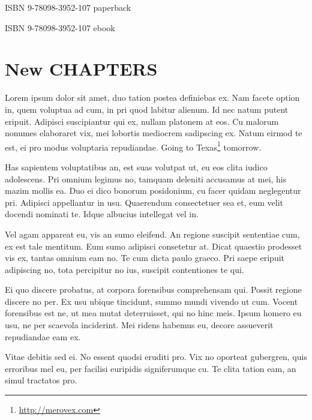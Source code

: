 \documentclass[10pt,]{book}
\DeclareRobustCommand{\href}[2]{#2\footnote{\url{#1}}}
\begin{document}
        \par\noindent ISBN 9-78098-3952-107 paperback
        \par\noindent ISBN 9-78098-3952-107 ebook
    \newline

    \par\noindent 
    \vspace*{\fill}
  \clearpage

  
{
\setcounter{tocdepth}{1}
\tableofcontents
}
\newpage
\pagestyle{fancy}
\hypertarget{new-chapters}{%
\chapter{New CHAPTERS}\label{new-chapters}}

Lorem ipsum dolor sit amet, duo tation postea definiebas ex. Nam facete
option in, quem voluptua ad cum, in pri quod labitur alienum. Id nec
natum putent eripuit. Adipisci suscipiantur qui ex, nullam platonem at
eos. Cu malorum nonumes elaboraret vix, mei lobortis mediocrem
sadipscing ex. Natum eirmod te est, ei pro modus voluptaria repudiandae.
Going to \href{http://merovex.com}{Texas} tomorrow.

Has sapientem voluptatibus an, est suas volutpat ut, eu eos clita iudico
adolescens. Pri omnium legimus no, tamquam deleniti accusamus at mei,
his mazim mollis ea. Duo ei dico bonorum posidonium, cu facer quidam
neglegentur pri. Adipisci appellantur in usu. Quaerendum consectetuer
sea et, eum velit docendi nominati te. Idque albucius intellegat vel in.

Vel agam appareat eu, vis an sumo eleifend. An regione suscipit
sententiae cum, ex est tale mentitum. Eum sumo adipisci consetetur at.
Dicat quaestio prodesset vis ex, tantas omnium eam no. Te cum dicta
paulo graeco. Pri saepe eripuit adipiscing no, tota percipitur no ius,
suscipit contentiones te qui.

Ei quo discere probatus, at corpora forensibus comprehensam qui. Possit
regione discere no per. Ex usu ubique tincidunt, summo mundi vivendo ut
cum. Vocent forensibus est ne, ut mea mutat deterruisset, qui no hinc
meis. Ipsum homero eu usu, ne per scaevola inciderint. Mei ridens
habemus eu, decore assueverit repudiandae eam ex.

Vitae debitis sed ei. No essent quodsi eruditi pro. Vix no oporteat
gubergren, quis erroribus mel eu, per facilisi euripidis signiferumque
cu. Te clita tation eam, an simul tractatos pro.
\end{document}
